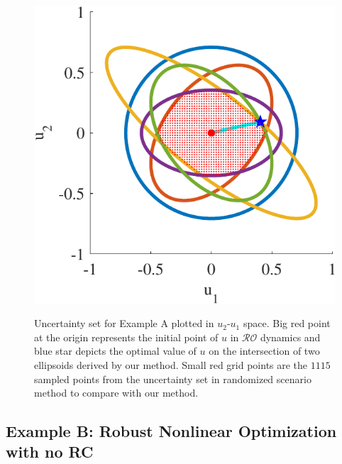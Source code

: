 \documentclass[journal,twoside,web]{ieeecolor}
\newcommand{\rev}[1]{\textcolor{revisionblue}{#1}}
\begin{document}
\begin{figure}
\begin{center}
\includegraphics[scale=0.55]{ellipsoids}
\vspace{-1.5mm}
\caption{\rev{Uncertainty set for Example A plotted in $u_
2$-$u_1$ space. Big red point at the origin represents the initial point of $u$ in $\mathcal{RO}$ dynamics and blue star depicts the optimal value of $u$ on the intersection of two ellipsoids derived by our method. Small red grid points are the $1115$ sampled points from the uncertainty set in randomized scenario method \cite{calafiore2004} to compare with our method.}}
\vspace{-8mm}
\label{ellipsoids}
\end{center}
\end{figure}

\subsection*{\rev{Example B: Robust Nonlinear Optimization with no RC}}\label{norc.sec}
\end{document}
